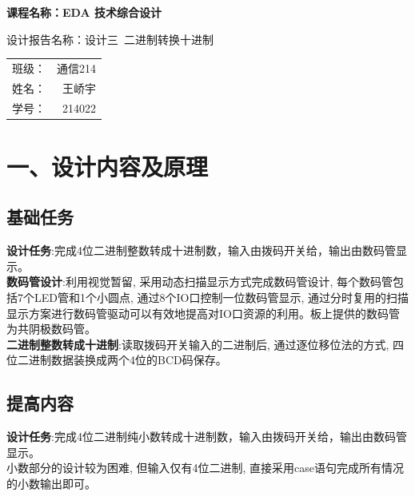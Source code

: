 \documentclass{article}
\newcommand{\fourhao}{\fontsize{14pt}{\baselineskip}\selectfont} %
\newcommand{\xiaosihao}{\fontsize{12pt}{\baselineskip}\selectfont} %
\begin{document}
\begin{titlepage}
    \centering
    \vspace*{2cm}

    \Huge
    \textbf{课程名称：EDA 技术综合设计}

    \vspace{2cm}

    \LARGE
    设计报告名称：设计三\ 二进制转换十进制

    \vspace{4cm}

    \centering
    \Large
    \begin{tabular}{rl}
        班级： & 通信214    \\
        姓名： & \ 王峤宇    \\
        学号： & \ 214022
    \end{tabular}

    \vfill

    \vspace{1cm}
\end{titlepage}

\newpage
\section*{\fourhao 一、设计内容及原理}
\xiaosihao
{}
\subsection*{基础任务}
\textbf{设计任务}:完成4位二进制整数转成十进制数，输入由拨码开关给，输出由数码管显示。\\
\textbf{数码管设计}:利用视觉暂留, 采用动态扫描显示方式完成数码管设计, 每个数码管包括7个LED管和1个小圆点, 通过8个IO口控制一位数码管显示, 通过分时复用的扫描显示方案进行数码管驱动可以有效地提高对IO口资源的利用。板上提供的数码管为共阴极数码管。\\
\textbf{二进制整数转成十进制}:读取拨码开关输入的二进制后, 通过逐位移位法的方式, 四位二进制数据装换成两个4位的BCD码保存。\\
\subsection*{提高内容}
\textbf{设计任务}:完成4位二进制纯小数转成十进制数，输入由拨码开关给，输出由数码管显示。\\
小数部分的设计较为困难, 但输入仅有4位二进制, 直接采用case语句完成所有情况的小数输出即可。
\end{document}
